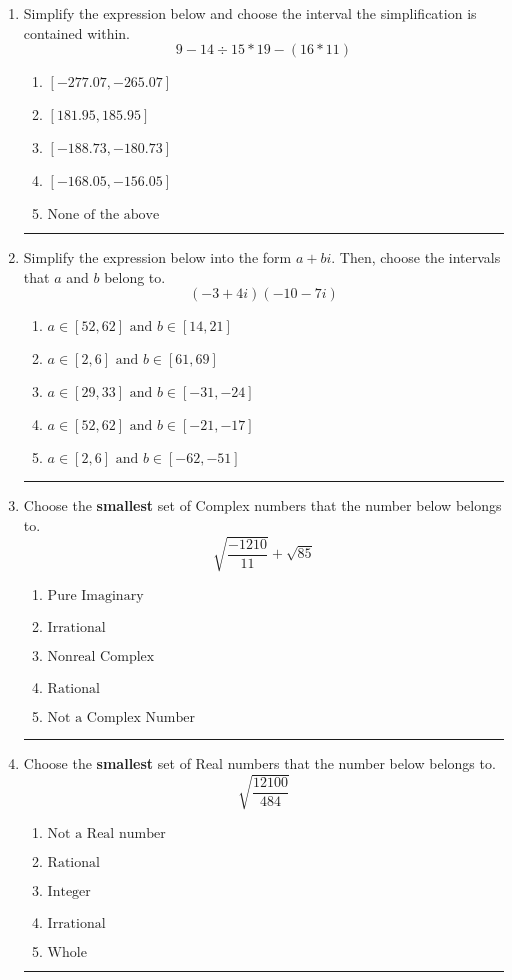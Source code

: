 \documentclass[14pt]{extbook}
\newcommand{\litem}[1]{\item#1\hspace*{-1cm}\rule{\textwidth}{0.4pt}}
\begin{document}
\begin{enumerate}
\litem{
Simplify the expression below and choose the interval the simplification is contained within.\[ 9 - 14 \div 15 * 19 - (16 * 11) \]\begin{enumerate}[label=\Alph*.]
\item \( [-277.07, -265.07] \)
\item \( [181.95, 185.95] \)
\item \( [-188.73, -180.73] \)
\item \( [-168.05, -156.05] \)
\item \( \text{None of the above} \)

\end{enumerate} }
\litem{
Simplify the expression below into the form $a+bi$. Then, choose the intervals that $a$ and $b$ belong to.\[ (-3 + 4 i)(-10 - 7 i) \]\begin{enumerate}[label=\Alph*.]
\item \( a \in [52, 62] \text{ and } b \in [14, 21] \)
\item \( a \in [2, 6] \text{ and } b \in [61, 69] \)
\item \( a \in [29, 33] \text{ and } b \in [-31, -24] \)
\item \( a \in [52, 62] \text{ and } b \in [-21, -17] \)
\item \( a \in [2, 6] \text{ and } b \in [-62, -51] \)

\end{enumerate} }
\litem{
Choose the \textbf{smallest} set of Complex numbers that the number below belongs to.\[ \sqrt{\frac{-1210}{11}}+\sqrt{85} \]\begin{enumerate}[label=\Alph*.]
\item \( \text{Pure Imaginary} \)
\item \( \text{Irrational} \)
\item \( \text{Nonreal Complex} \)
\item \( \text{Rational} \)
\item \( \text{Not a Complex Number} \)

\end{enumerate} }
\litem{
Choose the \textbf{smallest} set of Real numbers that the number below belongs to.\[ \sqrt{\frac{12100}{484}} \]\begin{enumerate}[label=\Alph*.]
\item \( \text{Not a Real number} \)
\item \( \text{Rational} \)
\item \( \text{Integer} \)
\item \( \text{Irrational} \)
\item \( \text{Whole} \)


\end{enumerate}}
\end{enumerate}
\end{document}

